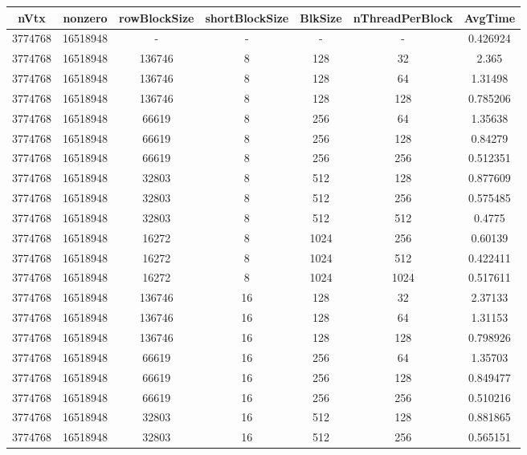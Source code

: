 \documentclass[9pt]{article}
\begin{document}
\SetBgPosition{0.25cm,-5.0cm}
\begin{tabular}{|c|c|c|c|c|c|c| }  
\hline
nVtx  & nonzero  & rowBlockSize  & shortBlockSize  & BlkSize  & nThreadPerBlock  & AvgTime \\
\hline
3774768  & 16518948  &  -  & -  & -  & -  &0.426924 \\
\hline
3774768  & 16518948  & 136746  & 8  & 128  & 32  & 2.365 \\
\hline
3774768  & 16518948  & 136746  & 8  & 128  & 64  & 1.31498 \\
\hline
3774768  & 16518948  & 136746  & 8  & 128  & 128  & 0.785206 \\
\hline
3774768  & 16518948  & 66619  & 8  & 256  & 64  & 1.35638 \\
\hline
3774768  & 16518948  & 66619  & 8  & 256  & 128  & 0.84279 \\
\hline
3774768  & 16518948  & 66619  & 8  & 256  & 256  & 0.512351 \\
\hline
3774768  & 16518948  & 32803  & 8  & 512  & 128  & 0.877609 \\
\hline
3774768  & 16518948  & 32803  & 8  & 512  & 256  & 0.575485 \\
\hline
3774768  & 16518948  & 32803  & 8  & 512  & 512  & 0.4775 \\
\hline
3774768  & 16518948  & 16272  & 8  & 1024  & 256  & 0.60139 \\
\hline
3774768  & 16518948  & 16272  & 8  & 1024  & 512  & 0.422411 \\
\hline
3774768  & 16518948  & 16272  & 8  & 1024  & 1024  & 0.517611 \\
\hline
3774768  & 16518948  & 136746  & 16  & 128  & 32  & 2.37133 \\
\hline
3774768  & 16518948  & 136746  & 16  & 128  & 64  & 1.31153 \\
\hline
3774768  & 16518948  & 136746  & 16  & 128  & 128  & 0.798926 \\
\hline
3774768  & 16518948  & 66619  & 16  & 256  & 64  & 1.35703 \\
\hline
3774768  & 16518948  & 66619  & 16  & 256  & 128  & 0.849477 \\
\hline
3774768  & 16518948  & 66619  & 16  & 256  & 256  & 0.510216 \\
\hline
3774768  & 16518948  & 32803  & 16  & 512  & 128  & 0.881865 \\
\hline
3774768  & 16518948  & 32803  & 16  & 512  & 256  & 0.565151 \\

\end{tabular}
\end{document}
